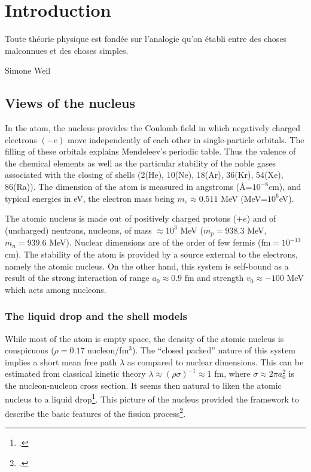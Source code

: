 	\chapter{Introduction}\label{introduction}
	 \epigraph{Toute th\'eorie physique est fond\'ee sur l'analogie qu'on \'etabli entre des choses malconnues et des choses simples.}{Simone Weil}
\section{Views of the nucleus}
In the atom, the nucleus provides the Coulomb field in which negatively charged electrons $(-e)$ move independently of each other in single-particle orbitals. The filling of these orbitals explains Mendeleev's periodic table. Thus the valence of the chemical elements as well as the particular stability of the noble gases associated with the closing of shells (2(He), 10(Ne), 18(Ar), 36(Kr), 54(Xe), 86(Ra)). The dimension of the atom is measured in angstroms (\AA=$10^{-8}$cm), and typical energies in eV, the electron mass being $m_e\approx 0.511$ MeV (MeV=$10^6$eV).


The atomic nucleus is made out of positively charged protons ($+e$) and of (uncharged) neutrons, nucleons, of mass $\approx 10^3$ MeV ($m_p=938.3$ MeV, $m_n=939.6$ MeV). Nuclear dimensions are of the order of few fermis (fm$=10^{-13}$ cm).  The stability of the atom is provided by a source external to the electrons, namely the atomic nucleus. On the other hand, this system is  self-bound as a result of the strong interaction of range $a_0\approx 0.9$ fm and strength $v_0\approx -100$ MeV which acts among nucleons. 
\subsection{The liquid drop and the shell models}\label{S1.1.1}
While most of the atom is empty space, the density of the atomic nucleus is conspicuous ($\rho=0.17$ nucleon/fm$^3$). The ``closed packed'' nature of this system implies a short mean free path $\lambda$ as compared to nuclear dimensions. This can be estimated from classical kinetic theory $\lambda\approx(\rho\sigma)^{-1}\approx1$ fm, where $\sigma\approx 2\pi a_0^2$ is the nucleon-nucleon cross section. It seems then natural to liken the atomic nucleus to a liquid drop\footnote{\cite{Bohr:37}.}.
This picture of the nucleus provided the framework to describe the basic features of the fission process\footnote{\cite{Meitner:39,Bohr:39}.}. 



